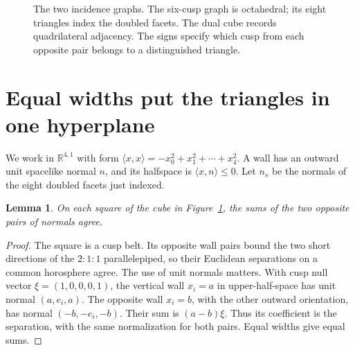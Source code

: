 \documentclass[11pt]{article}
\newtheorem{lemma}[theorem]{Lemma}
\theoremstyle{remark}
\newcommand{\ip}[2]{\langle #1,#2\rangle}
\begin{document}
\begin{figure}[htbp]
\centering
{}
\caption{The two incidence graphs. The six-cusp graph is octahedral;
its eight triangles index the doubled facets. The dual cube records
quadrilateral adjacency. The signs specify which cusp from each
opposite pair belongs to a distinguished triangle.}
\label{fig:graphs}
\end{figure}

\section{Equal widths put the triangles in one hyperplane}

We work in $\mathbb R^{4,1}$ with form
$\ip{x}{x}=-x_0^2+x_1^2+\cdots+x_4^2$. A wall has an outward
unit spacelike normal $n$, and its halfspace is $\ip{x}{n}\le0$.
Let $n_s$ be the normals of the eight doubled facets just indexed.

\begin{lemma}\label{lem:width}
On each square of the cube in Figure~\ref{fig:graphs}, the sums of
the two opposite pairs of normals agree.
\end{lemma}
\begin{proof}
The square is a cusp belt. Its opposite wall pairs bound the two
short directions of the $2:1:1$ parallelepiped, so their Euclidean separations
on a common horosphere agree. The use of unit normals matters.
With cusp null vector $\xi=(1,0,0,0,1)$, the vertical wall $x_i=a$
in upper-half-space has unit normal $(a,e_i,a)$. The opposite wall
$x_i=b$, with the other outward orientation, has normal
$(-b,-e_i,-b)$. Their sum is $(a-b)\xi$. Thus its coefficient is
the separation, with the same normalization for both pairs. Equal
widths give equal sums.
\end{proof}
\end{document}
